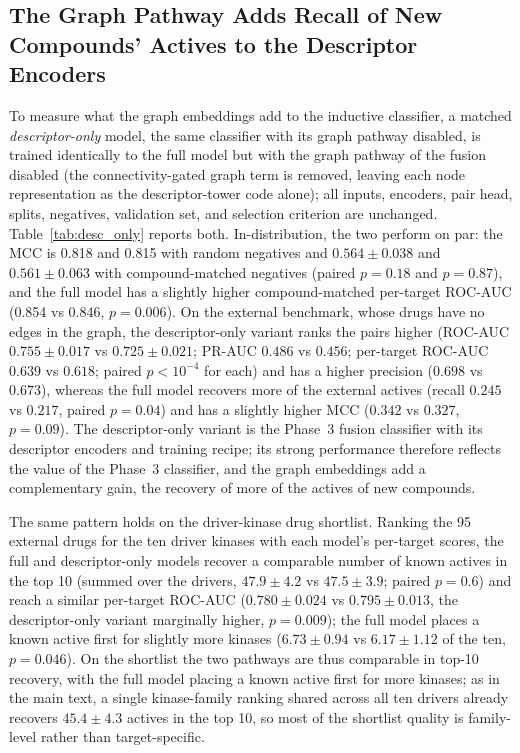 \documentclass[11pt,letterpaper]{article}
\begin{document}
\subsection{The Graph Pathway Adds Recall of New Compounds' Actives to the Descriptor Encoders}
\label{sec:desc_only}
To measure what the graph embeddings add to the inductive classifier, a matched \emph{descriptor-only} model, the same classifier with its graph pathway disabled, is trained identically to the full model but with the graph pathway of the fusion disabled (the connectivity-gated graph term is removed, leaving each node representation as the descriptor-tower code alone); all inputs, encoders, pair head, splits, negatives, validation set, and selection criterion are unchanged. Table~\ref{tab:desc_only} reports both. In-distribution, the two perform on par: the MCC is 0.818 and 0.815 with random negatives and $0.564\pm0.038$ and $0.561\pm0.063$ with compound-matched negatives (paired $p=0.18$ and $p=0.87$), and the full model has a slightly higher compound-matched per-target ROC-AUC (0.854 vs 0.846, $p=0.006$). On the external benchmark, whose drugs have no edges in the graph, the descriptor-only variant ranks the pairs higher (ROC-AUC $0.755\pm0.017$ vs $0.725\pm0.021$; PR-AUC $0.486$ vs $0.456$; per-target ROC-AUC $0.639$ vs $0.618$; paired $p<10^{-4}$ for each) and has a higher precision ($0.698$ vs $0.673$), whereas the full model recovers more of the external actives (recall $0.245$ vs $0.217$, paired $p=0.04$) and has a slightly higher MCC ($0.342$ vs $0.327$, $p=0.09$). The descriptor-only variant is the Phase~3 fusion classifier with its descriptor encoders and training recipe; its strong performance therefore reflects the value of the Phase~3 classifier, and the graph embeddings add a complementary gain, the recovery of more of the actives of new compounds.

The same pattern holds on the driver-kinase drug shortlist. Ranking the 95 external drugs for the ten driver kinases with each model's per-target scores, the full and descriptor-only models recover a comparable number of known actives in the top 10 (summed over the drivers, $47.9\pm4.2$ vs $47.5\pm3.9$; paired $p=0.6$) and reach a similar per-target ROC-AUC ($0.780\pm0.024$ vs $0.795\pm0.013$, the descriptor-only variant marginally higher, $p=0.009$); the full model places a known active first for slightly more kinases ($6.73\pm0.94$ vs $6.17\pm1.12$ of the ten, $p=0.046$). On the shortlist the two pathways are thus comparable in top-10 recovery, with the full model placing a known active first for more kinases; as in the main text, a single kinase-family ranking shared across all ten drivers already recovers $45.4\pm4.3$ actives in the top 10, so most of the shortlist quality is family-level rather than target-specific.
\end{document}
